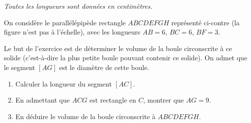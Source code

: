 \documentclass[11pt]{article}
\begin{document}
\begin{exercice}\emph{Toutes les longueurs sont données en centimètres.}

  \begin{multicols}{2}
    \noindent On considère le parallélépipède rectangle $ABCDEFGH$ représenté ci-contre (la figure n'est pas à l'échelle), avec les longueurs $AB=6$, $BC=6$, $BF=3$.

  \begin{center}

\end{center}
\end{multicols}

Le but de l'exercice est de déterminer le volume de la boule circonscrite à ce solide (c'est-à-dire la plus petite boule pouvant contenir ce solide). On admet que le segment $[AG]$ est le diamètre de cette boule.

\begin{enumerate}
  \item Calculer la longueur du segment $[AC]$.
  \item En admettant que $ACG$ est rectangle en $C$, montrer que $AG=9$.
  \item En déduire le volume de la boule circonscrite à $ABCDEFGH$.
\end{enumerate}
\end{exercice}
\end{document}
